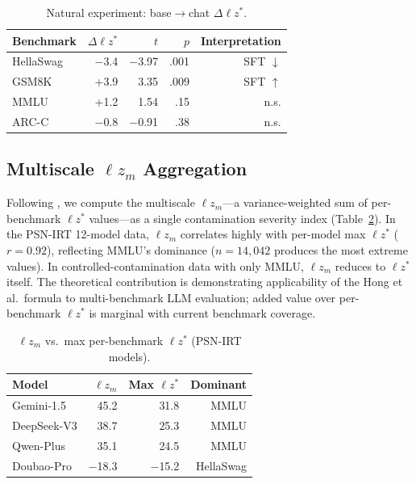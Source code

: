 \documentclass[11pt,twocolumn]{article}
\newcommand{\lzs}{\ensuremath{\ell z^*}}
\newcommand{\lzm}{\ensuremath{\ell z_m}}
\begin{document}
\begin{table}[t]
\centering
\caption{Natural experiment: base$\to$chat $\Delta\lzs$.}
\label{tab:natural}
\footnotesize
\begin{tabular}{lrrrr}
\toprule
Benchmark & $\Delta\lzs$ & $t$ & $p$ & Interpretation \\
\midrule
HellaSwag & $-$3.4 & $-$3.97 & .001 & SFT $\downarrow$ \\
GSM8K & +3.9 & 3.35 & .009 & SFT $\uparrow$ \\
MMLU & +1.2 & 1.54 & .15 & n.s. \\
ARC-C & $-$0.8 & $-$0.91 & .38 & n.s. \\
\bottomrule
\end{tabular}
\vspace{-0.3cm}
\end{table}

\subsection{Multiscale $\lzm$ Aggregation}

Following \citet{hong2021lzm}, we compute the multiscale $\lzm$---a variance-weighted sum of per-benchmark $\lzs$ values---as a single contamination severity index (Table~\ref{tab:lzm}). In the PSN-IRT 12-model data, $\lzm$ correlates highly with per-model max $\lzs$ ($r = 0.92$), reflecting MMLU's dominance ($n = 14{,}042$ produces the most extreme values). In controlled-contamination data with only MMLU, $\lzm$ reduces to $\lzs$ itself. The theoretical contribution is demonstrating applicability of the Hong et al.\ formula to multi-benchmark LLM evaluation; added value over per-benchmark $\lzs$ is marginal with current benchmark coverage.

\begin{table}[t]
\centering
\caption{$\lzm$ vs.\ max per-benchmark $\lzs$ (PSN-IRT models).}
\label{tab:lzm}
\footnotesize
\begin{tabular}{lrrr}
\toprule
Model & $\lzm$ & Max $\lzs$ & Dominant \\
\midrule
Gemini-1.5 & 45.2 & 31.8 & MMLU \\
DeepSeek-V3 & 38.7 & 25.3 & MMLU \\
Qwen-Plus & 35.1 & 24.5 & MMLU \\
Doubao-Pro & $-$18.3 & $-$15.2 & HellaSwag \\
\bottomrule
\end{tabular}
\vspace{-0.3cm}
\end{table}
\end{document}

